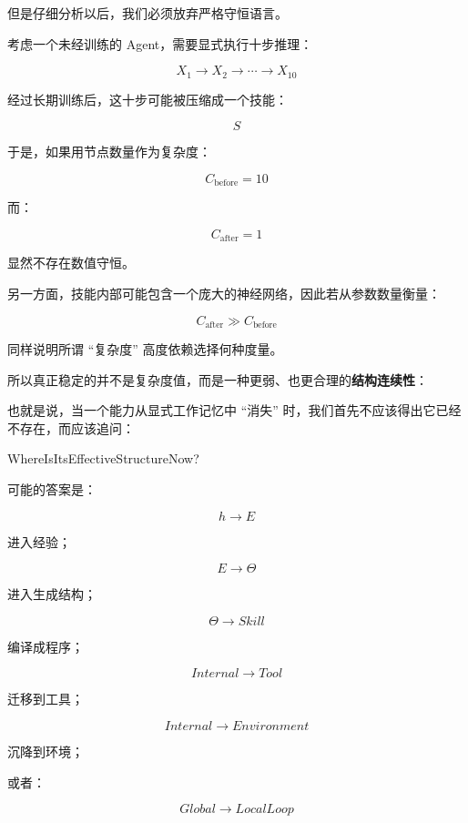 但是仔细分析以后，我们必须放弃严格守恒语言。

考虑一个未经训练的 Agent，需要显式执行十步推理：

\[
X_1\rightarrow X_2\rightarrow\cdots\rightarrow X_{10}
\]

经过长期训练后，这十步可能被压缩成一个技能：

\[
S
\]

于是，如果用节点数量作为复杂度：

\[
C_{\mathrm{before}}=10
\]

而：

\[
C_{\mathrm{after}}=1
\]

显然不存在数值守恒。

另一方面，技能内部可能包含一个庞大的神经网络，因此若从参数数量衡量：

\[
C_{\mathrm{after}}
\gg
C_{\mathrm{before}}
\]

同样说明所谓 ``复杂度'' 高度依赖选择何种度量。

所以真正稳定的并不是复杂度值，而是一种更弱、也更合理的\textbf{结构连续性}：

\begin{statementbox}
\centering
{}
\end{statementbox}

也就是说，当一个能力从显式工作记忆中 ``消失'' 时，我们首先不应该得出它已经不存在，而应该追问：

\begin{statementbox}
WhereIsItsEffectiveStructureNow?
\end{statementbox}

可能的答案是：

\[
h\rightarrow E
\]

进入经验；

\[
E\rightarrow\Theta
\]

进入生成结构；

\[
\Theta\rightarrow Skill
\]

编译成程序；

\[
Internal\rightarrow Tool
\]

迁移到工具；

\[
Internal\rightarrow Environment
\]

沉降到环境；

或者：

\[
Global\rightarrow LocalLoop
\]

